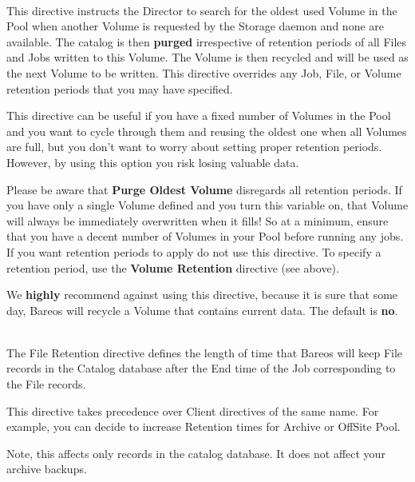 \begin{description}
\label{PurgeOldest}
\item [Purge Oldest Volume = {\textless}yes{\textbar}no{\textgreater}] \hfill \\
This directive instructs the Director to search for the oldest used
Volume in the Pool when another Volume is requested by the Storage
daemon and none are available.  The catalog is then {\bf purged}
irrespective of retention periods of all Files and Jobs written to this
Volume.  The Volume is then recycled and will be used as the next Volume
to be written.  This directive overrides any Job, File, or Volume
retention periods that you may have specified.

This directive can be useful if you have a fixed number of Volumes in
the Pool and you want to cycle through them and reusing the oldest one
when all Volumes are full, but you don't want to worry about setting
proper retention periods.  However, by using this option you risk losing
valuable data.

Please be aware that {\bf Purge Oldest Volume} disregards all retention
periods. If you have only a single Volume defined and you turn this
variable on, that Volume will always be immediately overwritten when it
fills!  So at a minimum, ensure that you have a decent number of Volumes
in your Pool before running any jobs.  If you want retention periods to
apply do not use this directive.  To specify a retention period, use the
{\bf Volume Retention} directive (see above).

We {\bf highly} recommend against using this directive, because it is
sure that some day, Bareos will recycle a Volume that contains current
data.  The default is {\bf no}.

\item [File Retention = {\textless}time-period-specification{\textgreater}] \hfill \\
The File Retention directive defines the length of time that  Bareos will
keep File records in the Catalog database after the End time of the
Job corresponding to the File records.

This directive takes precedence over Client directives of the same name. For
example, you can decide to increase Retention times for Archive or OffSite
Pool.

Note, this affects only records in the catalog database. It does not affect
your archive backups.


\end{description}
